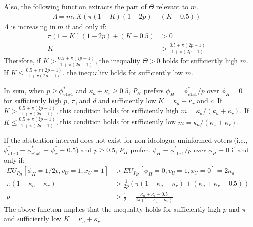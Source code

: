 \par Also, the following function extracts the part of $\Theta$ relevant to $m$. 
\begin{align*}
\Lambda = m \pi K( \pi(1-K)(1-2p)+(K-0.5))
\end{align*}
\noindent $\Lambda$ is increasing in $m$ if and only if: 
\begin{align*}
\pi(1-K)(1-2p)+(K-0.5) &> 0 \\
K &>\frac{0.5 + \pi(2p-1)}{1 + \pi(2p-1)} \tag{Note:$2p-1\geq0$}
\end{align*}
\noindent Therefore, if $K >\frac{0.5 + \pi(2p-1)}{1 + \pi(2p-1)}$, the inequality $\Theta > 0$ holds for sufficiently high $m$. If $K \leq \frac{0.5 + \pi(2p-1)}{1 + \pi(2p-1)}$, the inequality holds for sufficiently low $m$. 

\par In sum, when $p \geq \phi^*_{v1x1}$ and $\kappa_a+\kappa_r \geq 0.5$, $P_H$ prefers $\phi_H=\phi^*_{v1x1}/p$ over $\phi_H=0$ for sufficiently high $p$, $\pi$, and $d$ and sufficiently low $K = \kappa_a + \kappa_r$ and $c$. If $K >\frac{0.5 + \pi(2p-1)}{1 + \pi(2p-1)}$, this condition holds for sufficiently high $m = \kappa_a/(\kappa_a+\kappa_r)$. If $K \leq \frac{0.5 + \pi(2p-1)}{1 + \pi(2p-1)}$, this condition holds for sufficiently low $m = \kappa_a/(\kappa_a+\kappa_r)$.

\par If the abstention interval does not exist for non-ideologue uninformed voters (i.e., $\phi^*_{v1x0}=\phi^*_{v1x1}=\phi^*_x=0.5$) and $p \geq 0.5$, $P_H$ prefers $\phi_H = \phi^*_{v1x1}/p$ over $\phi_H = 0$ if and only if:
\begin{align*}
EU_{P_H}[\phi_H = 1/2p, v_U = 1, x_U = 1] &> EU_{P_H}[\phi_H=0, v_U=1, x_U=0] = 2 \kappa_a \\ 
\pi (1-\kappa_a-\kappa_r) &> \frac{1}{2p} (\pi(1-\kappa_a-\kappa_r) + (\kappa_a + \kappa_r - 0.5)) \\
p &> \frac{1}{2}+ \frac{\kappa_a + \kappa_r - 0.5}{2\pi(1-\kappa_a-\kappa_r)}
\end{align*}
\noindent The above function implies that the inequality holds for sufficiently high $p$ and $\pi$ and sufficiently low $K = \kappa_a + \kappa_r$.


